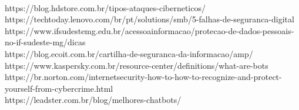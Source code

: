 \label{Referências}\\https://blog.hdstore.com.br/tipos-ataques-ciberneticos/\\
https://techtoday.lenovo.com/br/pt/solutions/smb/5-falhas-de-seguranca-digital\\
https://www.ifsudestemg.edu.br/acessoainformacao/protecao-de-dados-pessoais-no-if-sudeste-mg/dicas\\
https://blog.ecoit.com.br/cartilha-de-seguranca-da-informacao/amp/\\
https://www.kaspersky.com.br/resource-center/definitions/what-are-bots\\
https://br.norton.com/internetsecurity-how-to-how-to-recognize-and-protect-yourself-from-cybercrime.html\\
https://leadster.com.br/blog/melhores-chatbots/\\